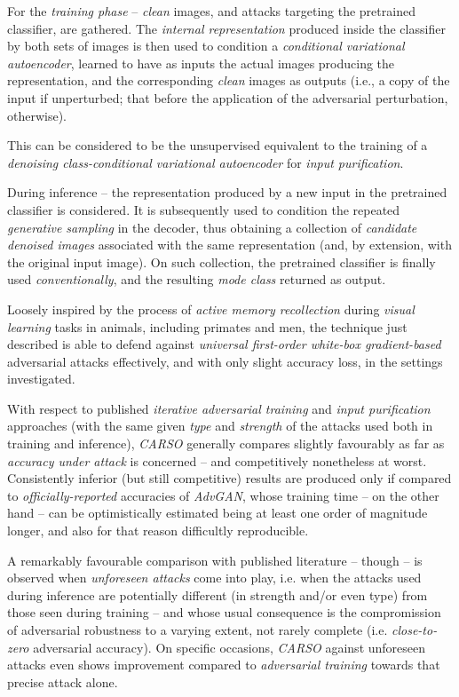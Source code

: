For the \textit{training phase} – \textit{clean} images, and attacks targeting the pretrained classifier, are gathered. The \textit{internal representation} produced inside the classifier by both sets of images is then used to condition a \textit{conditional variational autoencoder}, learned to have as inputs the actual images producing the representation, and the corresponding \textit{clean} images as outputs (i.e., a copy of the input if unperturbed; that before the application of the adversarial perturbation, otherwise).

This can be considered to be the unsupervised equivalent to the training of a \textit{denoising class-conditional variational autoencoder} for \textit{input purification}.

During inference – the representation produced by a new input in the pretrained classifier is considered. It is subsequently used to condition the repeated \textit{generative sampling} in the decoder, thus obtaining a collection of \textit{candidate denoised images} associated with the same representation (and, by extension, with the original input image). On such collection, the pretrained classifier is finally used \textit{conventionally}, and the resulting \textit{mode class} returned as output.

Loosely inspired by the process of \textit{active memory recollection} during \textit{visual learning} tasks in animals, including primates and men, the technique just described is able to defend against \textit{universal first-order white-box gradient-based} adversarial attacks effectively, and with only slight accuracy loss, in the settings investigated.

With respect to published \textit{iterative adversarial training} and \textit{input purification} approaches (with the same given \textit{type} and \textit{strength} of the attacks used both in training and inference), \textit{CARSO} generally compares slightly favourably as far as \textit{accuracy under attack} is concerned – and competitively nonetheless at worst. Consistently inferior (but still competitive) results are produced only if compared to \textit{officially-reported} accuracies of \textit{AdvGAN}, whose training time – on the other hand – can be optimistically estimated being at least one order of magnitude longer, and also for that reason difficultly reproducible.

A remarkably favourable comparison with published literature – though – is observed when \textit{unforeseen attacks} come into play, i.e. when the attacks used during inference are potentially different (in strength and/or even type) from those seen during training – and whose usual consequence is the compromission of adversarial robustness to a varying extent, not rarely complete (i.e. \textit{close-to-zero} adversarial accuracy). On specific occasions, \textit{CARSO} against unforeseen attacks even shows improvement compared to \textit{adversarial training} towards that precise attack alone.

